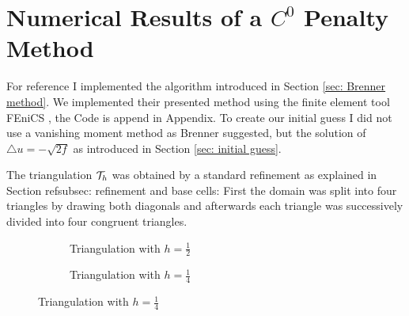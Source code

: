 
\section{Numerical Results of a $C^0$ Penalty Method}\label{sec: numerical results brenner}



For reference I implemented the algorithm introduced in Section \ref{sec: Brenner method}.
We implemented their presented method using the finite element tool FEniCS \cite{FEniCS}, the Code is append in Appendix. 
To create our initial guess I did not use a vanishing moment method as Brenner suggested, but the solution of $\triangle u = -\sqrt{2f}$ as introduced in Section \ref{sec: initial guess}. 

The triangulation $\mathcal{T}_h$ was obtained by a standard refinement as explained in Section ref{subsec: refinement and base cells}: First the domain was split into four triangles by drawing both diagonals and afterwards each triangle was successively divided into four congruent triangles.
\begin{figure}[H]
	\centering
	\begin{subfigure}{0.45\textwidth}
		\centering
		\edef \n {2}
		
		\caption{Triangulation with $h=\frac 1 2$}
		\label{fig: grid1}
	\end{subfigure}
	\begin{subfigure}{0.45\textwidth}
		\centering
		\edef \n {4}
		
		\caption{Triangulation with $h=\frac 1 4$}
		\label{fig: grid}
	\end{subfigure}	
	\caption{Triangulation with $h=\frac 1 4$}
	\label{fig: grids}
\end{figure}

